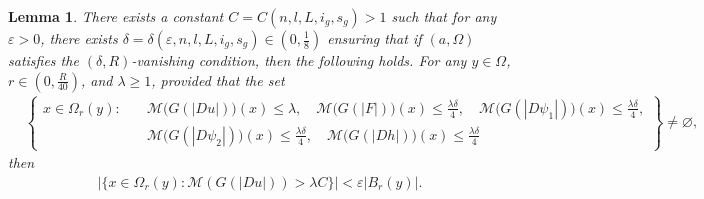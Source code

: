 \documentclass[10pt,a4paper]{amsart}
\newtheorem{lemma}{Lemma}
\begin{document}
 \begin{lemma}\label{lem5.1}
 	There exists a constant $C = C(n,l,L,i_g, s_g ) > 1$ such that for any $\varepsilon > 0$, there exists $\delta = \delta(\varepsilon,n,l,L,i_g, s_g) \in (0, \frac{1}{8})$ ensuring that if $(a, \Omega)$ satisfies the $(\delta, R)$-vanishing condition, then the following holds. For any $y \in \Omega$, $r \in (0, \frac{R}{40})$, and $\lambda \geq 1$, provided that the set 
 	\begin{align}\label{ml}
 		&\left\{
 		\begin{aligned}
 			x\in\Omega_r(y):\quad
 			&\mathcal{M}\bigl(G(|Du|)\bigr)(x)\leq\lambda,\quad
 			\mathcal{M}\bigl(G(|F|)\bigr)(x)\leq\frac{\lambda\delta}{4},\quad
 			\mathcal{M}\bigl(G(|D\psi_1|)\bigr)(x)\leq\frac{\lambda\delta}{4},
 			\\
 			&\mathcal{M}\bigl(G(|D\psi_2|)\bigr)(x)\leq\frac{\lambda\delta}{4},\quad
 			\mathcal{M}\bigl(G(|Dh|)\bigr)(x)\leq\frac{\lambda\delta}{4}
 		\end{aligned}
 		\right\}
 		\neq\varnothing,
 	\end{align}
 	then
 	\begin{align}
 		|\{x \in \Omega_r(y) : \mathcal{M}(G(|Du|)) > \lambda C\}| < \varepsilon |B_r(y)|.
 	\end{align}
 \end{lemma}
\end{document}
